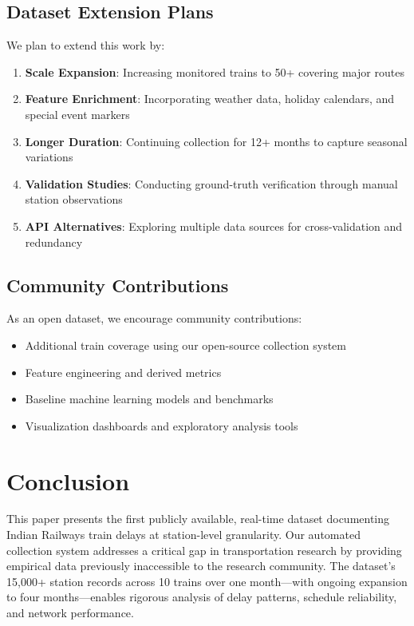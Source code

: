 \documentclass[11pt,a4paper]{article}
\begin{document}
\subsection{Dataset Extension Plans}

We plan to extend this work by:

\begin{enumerate}
    \item \textbf{Scale Expansion}: Increasing monitored trains to 50+ covering major routes
    \item \textbf{Feature Enrichment}: Incorporating weather data, holiday calendars, and special event markers
    \item \textbf{Longer Duration}: Continuing collection for 12+ months to capture seasonal variations
    \item \textbf{Validation Studies}: Conducting ground-truth verification through manual station observations
    \item \textbf{API Alternatives}: Exploring multiple data sources for cross-validation and redundancy
\end{enumerate}

\subsection{Community Contributions}

As an open dataset, we encourage community contributions:
\begin{itemize}
    \item Additional train coverage using our open-source collection system
    \item Feature engineering and derived metrics
    \item Baseline machine learning models and benchmarks
    \item Visualization dashboards and exploratory analysis tools
\end{itemize}

\section{Conclusion}

This paper presents the first publicly available, real-time dataset documenting Indian Railways train delays at station-level granularity. Our automated collection system addresses a critical gap in transportation research by providing empirical data previously inaccessible to the research community. The dataset's 15,000+ station records across 10 trains over one month—with ongoing expansion to four months—enables rigorous analysis of delay patterns, schedule reliability, and network performance.
\end{document}

